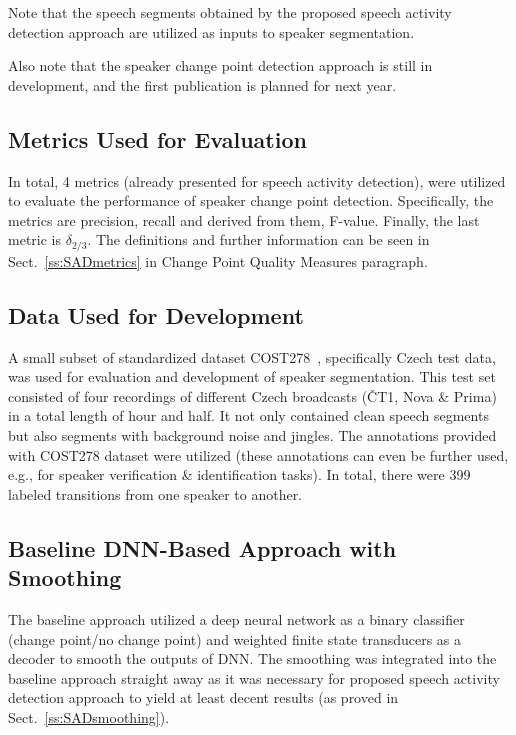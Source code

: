 \documentclass[FM,noheader,EN,bwtitles]{tulthesis}
\begin{document}
Note that the speech segments obtained by the proposed speech activity detection approach are utilized as inputs to speaker segmentation.

Also note that the speaker change point detection approach is still in development, and the first publication is planned for next year.

\subsection{Metrics Used for Evaluation}
\label{ss:SCHmetrics}
In total, 4 metrics (already presented for speech activity detection), were utilized to evaluate the performance of speaker change point detection.
Specifically, the metrics are precision, recall and derived from them, \mbox{F-value}.
Finally, the last metric is $\delta_{2/3}$.
The definitions and further information can be seen in Sect.~\ref{ss:SADmetrics} in Change Point Quality Measures paragraph.

\subsection{Data Used for Development}
\label{ss:SCHdata}
A small subset of standardized dataset COST278~\parencite{DBLP:conf/interspeech/ZibertMMMNFGDZPCZKTV05}, specifically Czech test data, was used for evaluation and development of speaker segmentation.
This test set consisted of four recordings of different Czech broadcasts (ČT1, Nova \& Prima) in a total length of hour and half.
It not only contained clean speech segments but also segments with background noise and jingles.
The annotations provided with COST278 dataset were utilized (these annotations can even be further used, e.g., for speaker verification \& identification tasks).
In total, there were 399 labeled transitions from one speaker to another.

\subsection{Baseline DNN-Based Approach with Smoothing}
\label{ss:SCHbaseline}
The baseline approach utilized a deep neural network as a binary classifier (change point/no change point) and weighted finite state transducers as a decoder to smooth the outputs of DNN.
The smoothing was integrated into the baseline approach straight away as it was necessary for proposed speech activity detection approach to yield at least decent results (as proved in Sect.~\ref{ss:SADsmoothing}).
\end{document}
